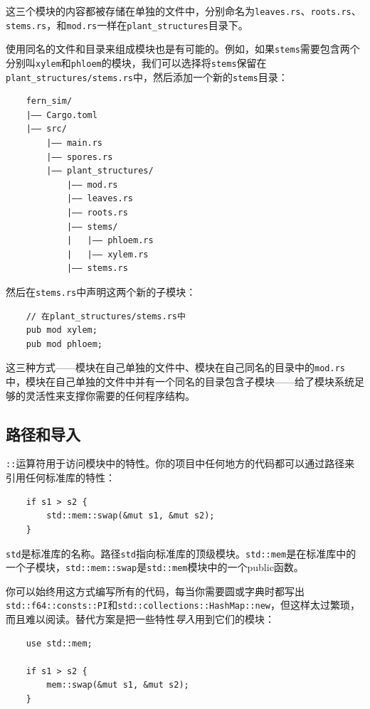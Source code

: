 这三个模块的内容都被存储在单独的文件中，分别命名为\texttt{leaves.rs}、\texttt{roots.rs}、\texttt{stems.rs}，和\texttt{mod.rs}一样在\texttt{plant\_structures}目录下。

使用同名的文件和目录来组成模块也是有可能的。例如，如果\texttt{stems}需要包含两个分别叫\texttt{xylem}和\texttt{phloem}的模块，我们可以选择将\texttt{stems}保留在\texttt{plant\_structures/stems.rs}中，然后添加一个新的\texttt{stems}目录：
\begin{verbatim}
    fern_sim/
    |—— Cargo.toml
    |—— src/
        |—— main.rs
        |—— spores.rs
        |—— plant_structures/
            |—— mod.rs
            |—— leaves.rs
            |—— roots.rs
            |—— stems/
            |   |—— phloem.rs
            |   |—— xylem.rs
            |—— stems.rs
\end{verbatim}

然后在\texttt{stems.rs}中声明这两个新的子模块：
\begin{verbatim}
    // 在plant_structures/stems.rs中
    pub mod xylem;
    pub mod phloem;
\end{verbatim}

这三种方式——模块在自己单独的文件中、模块在自己同名的目录中的\texttt{mod.rs}中，模块在自己单独的文件中并有一个同名的目录包含子模块——给了模块系统足够的灵活性来支撑你需要的任何程序结构。

\subsection{路径和导入}
\texttt{::}运算符用于访问模块中的特性。你的项目中任何地方的代码都可以通过路径来引用任何标准库的特性：
\begin{verbatim}
    if s1 > s2 {
        std::mem::swap(&mut s1, &mut s2);
    }
\end{verbatim}

\texttt{std}是标准库的名称。路径\texttt{std}指向标准库的顶级模块。\texttt{std::mem}是在标准库中的一个子模块，\texttt{std::mem::swap}是\texttt{std::mem}模块中的一个public函数。

你可以始终用这方式编写所有的代码，每当你需要圆或字典时都写出\texttt{std::f64::consts::PI}和\texttt{std::collections::HashMap::new}，但这样太过繁琐，而且难以阅读。替代方案是把一些特性\emph{导入}用到它们的模块：
\begin{verbatim}
    use std::mem;

    if s1 > s2 {
        mem::swap(&mut s1, &mut s2);
    }
\end{verbatim}

